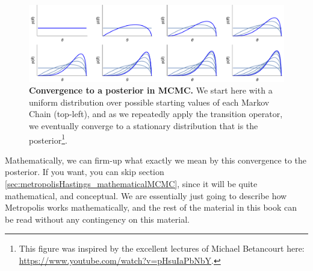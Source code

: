 \documentclass[11pt,fullpage]{book}
\begin{document}
\begin{figure}
\centerline{\includegraphics[width=1.5\textwidth]{metropolisHastings_convergenceToPosterior.pdf}}
\caption{\textbf{Convergence to a posterior in MCMC.} We start here with a uniform distribution over possible starting values of each Markov Chain (top-left), and as we repeatedly apply the transition operator, we eventually converge to a stationary distribution that is the posterior\footnote{This figure was inspired by the excellent lectures of Michael Betancourt here: \url{https://www.youtube.com/watch?v=pHsuIaPbNbY}.}.}\label{fig:metropolisHastings_convergenceToPosterior}
\end{figure}

Mathematically, we can firm-up what exactly we mean by this convergence to the posterior. If you want, you can skip section \ref{sec:metropolisHastings_mathematicalMCMC}, since it will be quite mathematical, and conceptual. We are essentially just going to describe how Metropolis works mathematically, and the rest of the material in this book can be read without any contingency on this material. 
\end{document}
